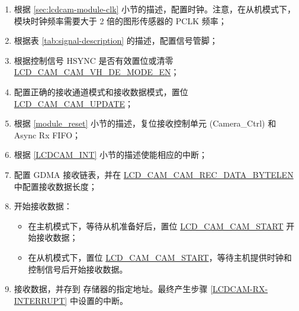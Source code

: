 \documentclass[main\_\_CN.tex]{subfiles}
\begin{document}
\begin{enumerate}
    \item 根据 \ref{sec:lcdcam-module-clk} 小节的描述，配置时钟。注意，在从机模式下，模块时钟频率需要大于 2 倍的图形传感器的 PCLK 频率；

    \item 根据表 \ref{tab:signal-description} 的描述，配置信号管脚；

    \item 根据控制信号 HSYNC 是否有效置位或清零 \hyperref[fielddesc:LCDCAMCAMVHDEMODEEN]{LCD\_CAM\_CAM\_VH\_DE\_MODE\_EN}；
    \item 配置正确的接收通道模式和接收数据模式，置位 \hyperref[fielddesc:LCDCAMCAMUPDATE]{LCD\_CAM\_CAM\_UPDATE}；

    \item 根据 \ref{module_reset} 小节的描述，复位接收控制单元 (Camera\_Ctrl) 和 Async Rx FIFO；
    \item 根据 \ref{LCDCAM_INT} 小节的描述使能相应的中断；\label{LCDCAM-RX-INTERRUPT}

    \item 配置 GDMA 接收链表，并在 \hyperref[fielddesc:LCDCAMCAMRECDATABYTELEN]{LCD\_CAM\_CAM\_REC\_DATA\_BYTELEN} 中配置接收数据长度；

    \item 开始接收数据：
    \begin{itemize}
        \item 在主机模式下，等待从机准备好后，置位 \hyperref[fielddesc:LCDCAMCAMSTART]{LCD\_CAM\_CAM\_START} 开始接收数据；
        \item 在从机模式下，置位 \hyperref[fielddesc:LCDCAMCAMSTART]{LCD\_CAM\_CAM\_START}，等待主机提供时钟和控制信号后开始接收数据。
    \end{itemize}
    \item 接收数据，并存到 \chipname{}  存储器的指定地址。最终产生步骤 \ref{LCDCAM-RX-INTERRUPT} 中设置的中断。
\end{enumerate}
\end{document}
